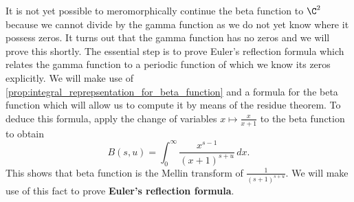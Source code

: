\documentclass[12pt]{article}
\begin{document}
      It is not yet possible to meromorphically continue the beta function to \(\C^{2}\) because we cannot divide by the gamma function as we do not yet know where it possess zeros. It turns out that the gamma function has no zeros and we will prove this shortly. The essential step is to prove Euler's reflection formula which relates the gamma function to a periodic function of which we know its zeros explicitly. We will make use of \cref{prop:integral_reprepsentation_for_beta_function} and a formula for the beta function which will allow us to compute it by means of the residue theorem. To deduce this formula, apply the change of variables \(x \mapsto \frac{x}{x+1}\) to the beta function to obtain
      \begin{equation}\label{equ:residue_form_beta_function}
        B(s,u) = \int_{0}^{\infty}\frac{x^{s-1}}{(x+1)^{s+u}}\,dx.
      \end{equation}
      This shows that beta function is the Mellin transform of \(\frac{1}{(s+1)^{s+u}}\). We will make use of this fact to prove \textbf{Euler's reflection formula}.
\end{document}
